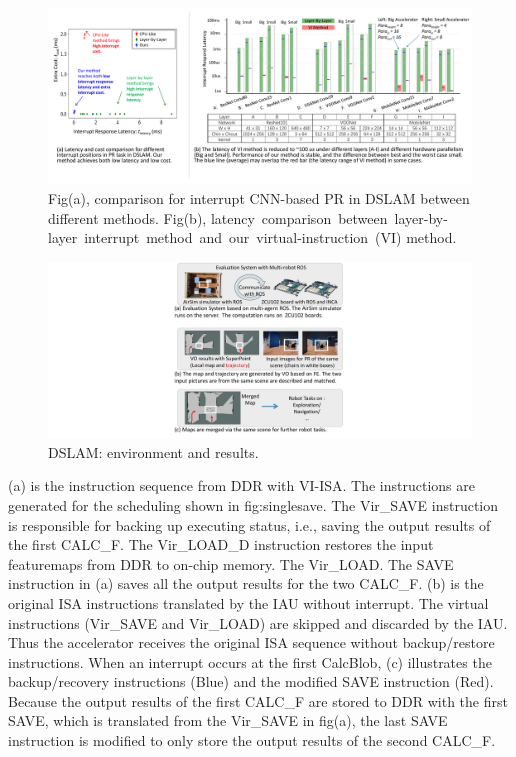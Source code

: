 \begin{figure}[t]
	\centering
   \vspace{-0.1cm} 
	\setlength{\abovecaptionskip}{0cm} 
	\includegraphics[width=0.99\linewidth]{fig/barresult.pdf}
	\caption{Fig(a), comparison for interrupt CNN-based PR in DSLAM between different methods. Fig(b), latency comparison between layer-by-layer interrupt method and our virtual-instruction (VI) method. }
	\label{fig:barresult}
   \end{figure}
   
   \begin{figure}[t]
	\centering
   \vspace{-0.1cm} 
	\setlength{\abovecaptionskip}{0cm} 
   \setlength{\belowcaptionskip}{-0.05cm} 
	\includegraphics[width=0.9\linewidth]{fig/env.pdf}
	\caption{ DSLAM: environment and results. }
	\label{fig:env}
   \end{figure}

(a) is the instruction sequence from DDR with VI-ISA. The instructions are generated for the scheduling shown in {fig:singlesave}. The Vir\_SAVE instruction is responsible for backing up executing status, i.e., saving the output results of the first CALC\_F. The Vir\_LOAD\_D instruction restores the input featuremaps from DDR to on-chip memory. The Vir\_LOAD. The SAVE instruction in (a) saves all the output results for the two CALC\_F.
(b) is the original ISA instructions translated by the IAU without interrupt. The virtual instructions (Vir\_SAVE and Vir\_LOAD) are skipped and discarded by the IAU. Thus the accelerator receives the original ISA sequence without backup/restore instructions.
When an interrupt occurs at the first CalcBlob, (c) illustrates the backup/recovery instructions (Blue) and the modified SAVE instruction (Red). Because the output results of the first CALC\_F are stored to DDR with the first SAVE, which is translated from the Vir\_SAVE in fig(a), the last SAVE instruction is modified to only store the output results of the second CALC\_F.


